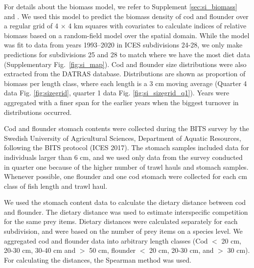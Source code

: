 \documentclass[9pt,twocolumn,twoside]{pnas-new}
\begin{document}
{For details about the biomass model, we refer to Supplement \ref{sec:si_biomass} and \citep{Lindmark2023}. We used this model to predict the biomass density of cod and flounder over a regular grid of 4 $\times$ 4 km squares with covariates to calculate indices of relative biomass based on a random-field model \citep{Shelton2014, Thorson2015} over the spatial domain. While the model was fit to data from years 1993–2020 in ICES subdivisions 24-28, we only make predictions for subdivisions 25 and 28 to match where we have the most diet data (Supplementary Fig.~\ref{fig:si_map}). Cod and flounder size distributions were also extracted from the DATRAS database. Distributions are shown as proportion of biomass per length class, where each length is a 3 cm moving average (Quarter 4 data Fig. \ref{fig:sizegrid}, quarter 1 data Fig. \ref{fig:si_sizegrid_q1}). Years were aggregated with a finer span for the earlier years when the biggest turnover in distributions occurred.

Cod and flounder stomach contents were collected during the BITS survey by the Swedish University of Agricultural Sciences, Department of Aquatic Resources, following the BITS protocol (ICES 2017). The stomach samples included data for individuals larger than 6 cm, and we used only data from the survey conducted in quarter one because of the higher number of trawl hauls and stomach samples. Whenever possible, one flounder and one cod stomach were collected for each cm class of fish length and trawl haul. 

We used the stomach content data to calculate the dietary distance between cod and flounder. The dietary distance was used to estimate interspecific competition for the same prey items. Dietary distances were calculated separately for each subdivision, and were based on the number of prey items on a species level. We aggregated cod and flounder data into arbitrary length classes (Cod $<$ 20 cm, 20-30 cm, 30-40 cm and $>$ 50 cm, flounder $<$ 20 cm, 20-30 cm, and $>$ 30 cm). For calculating the distances, the Spearman method was used.
}

\showmatmethods{} %


\showacknow{} %


\bibsplit[23]


\end{document}
